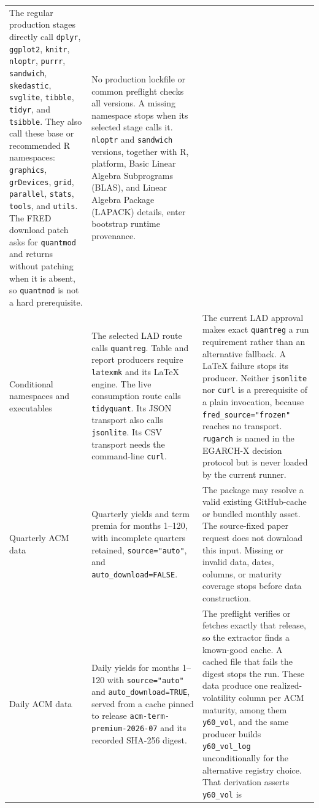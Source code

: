\documentclass[11pt]{article}
\DeclareRobustCommand{\code}[1]{%
  \ifmmode\text{\ttfamily\detokenize{#1}}\else\nolinkurl{#1}\fi}
\begin{document}
\begin{longtable}{@{}>{\raggedright\arraybackslash}p{}
  >{\raggedright\arraybackslash}p{}
  >{\raggedright\arraybackslash}p{}@{}}
The regular production stages directly call \code{dplyr}, \code{ggplot2},
\code{knitr}, \code{nloptr}, \code{purrr}, \code{sandwich}, \code{skedastic},
\code{svglite}, \code{tibble}, \code{tidyr}, and \code{tsibble}. They also call
these base or recommended R namespaces: \code{graphics}, \code{grDevices},
\code{grid}, \code{parallel}, \code{stats},
\code{tools}, and \code{utils}. The FRED download patch asks for \code{quantmod}
and returns without patching when it is absent, so \code{quantmod} is not a hard
prerequisite. &
No production lockfile or common preflight checks all versions.
A missing namespace stops when its selected stage calls it. \code{nloptr} and
\code{sandwich} versions, together with R, platform, Basic Linear Algebra Subprograms (BLAS), and Linear Algebra Package (LAPACK) details,
enter bootstrap runtime provenance.\\
Conditional namespaces and executables &
The selected LAD route calls \code{quantreg} 6.1. Table and report producers
require \code{latexmk} and its LaTeX engine. The live consumption route calls
\code{tidyquant}. Its JSON transport also calls \code{jsonlite}. Its CSV
transport needs the command-line \code{curl}. &
The current LAD approval makes exact \code{quantreg} 6.1 a run requirement rather
than an alternative fallback. A LaTeX failure stops its producer. Neither
\code{jsonlite} nor \code{curl} is a prerequisite of a plain invocation, because
\code{fred_source="frozen"} reaches no transport. \code{rugarch} is
named in the EGARCH-X decision protocol but is never loaded by the current
runner.\\
Quarterly ACM data &
Quarterly yields and term premia for months 1--120, with incomplete quarters
retained, \code{source="auto"}, and \code{auto_download=FALSE}. &
The package may resolve a valid existing GitHub-cache or bundled monthly asset.
The source-fixed paper request does not download this input. Missing or invalid
data, dates, columns, or maturity coverage stops before data construction.\\
Daily ACM data &
Daily yields for months 1--120 with \code{source="auto"} and
\code{auto_download=TRUE}, served from a cache pinned to release
\code{acm-term-premium-2026-07} and its recorded SHA-256 digest. &
The preflight verifies or fetches exactly that release, so the extractor finds a
known-good cache. A cached file that fails the digest stops the run. These data
produce one realized-volatility column per ACM maturity, among them
\code{y60_vol}, and the same producer builds \code{y60_vol_log} unconditionally
for the alternative registry choice. That derivation asserts \code{y60_vol} is

\end{longtable}
\end{document}
